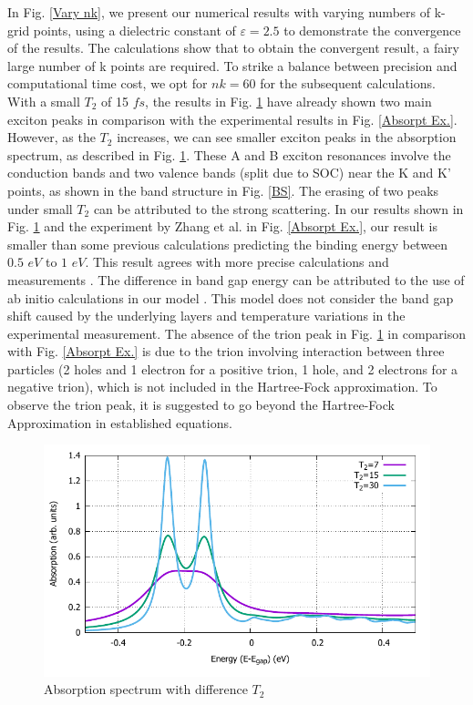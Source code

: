 \documentclass[12pt,english,a4paper]{article}
\begin{document}
\quad In Fig. \ref{Vary nk}, we present our numerical results with varying numbers of k-grid points, using a dielectric constant of $\varepsilon = 2.5$ to demonstrate the convergence of the results. The calculations show that to obtain the convergent result, a fairy large number of k points are required. To strike a balance between precision and computational time cost, we opt for $nk = 60$ for the subsequent calculations.\\\null
\quad With a small $T_2$ of 15 \(fs\), the results in Fig. \ref{Vary T2} have already shown two main exciton peaks in comparison with the experimental results in Fig. \ref{Absorpt Ex.}. However, as the $T_2$ increases, we can see smaller exciton peaks in the absorption spectrum, as described in Fig. \ref{Vary T2}. These A and B exciton resonances involve the conduction bands and two valence bands (split due to SOC) near the K and $\mathrm{K}$' points, as shown in the band structure in Fig. \ref{BS}. The erasing of two peaks under small $T_2$ can be attributed to the strong scattering. In our results shown in Fig. \ref{Vary T2} and the experiment by Zhang et al. \cite{zhang_absorption_2014} in Fig. \ref{Absorpt Ex.}, our result is smaller than some previous calculations predicting the binding energy between $0.5$ \(eV\) to $1 $ \(eV\)\cite{ramasubramaniam_large_2012,qiu_optical_2013,cheiwchanchamnangij_quasiparticle_2012, shi_quasiparticle_2013}. This result agrees with more precise calculations and measurements \cite{zhang_absorption_2014, kirichenko_influence_2021, zhang_direct_2014,Exper_for_quasi-bandgap}. The difference in band gap energy can be attributed to the use of ab initio calculations in our model \cite{liu_three-band_2013}. This model does not consider the band gap shift caused by the underlying layers and temperature variations in the experimental measurement. The absence of the trion peak in Fig. \ref{Vary T2} in comparison with Fig. \ref{Absorpt Ex.} is due to the trion involving interaction between three particles (2 holes and 1 electron for a positive trion, 1 hole, and 2 electrons for a negative trion), which is not included in the Hartree-Fock approximation. To observe the trion peak, it is suggested to go beyond the Hartree-Fock Approximation in established equations.\\
\begin{figure}
	\begin{center}
		\includegraphics[width=0.75\linewidth]{images/varyT2.pdf}
		\caption[Absorption spectrum with difference $T_2$]{Absorption spectrum with difference $T_2$}
		\label{Vary T2}
	\end{center}
\end{figure}\null
\end{document}
